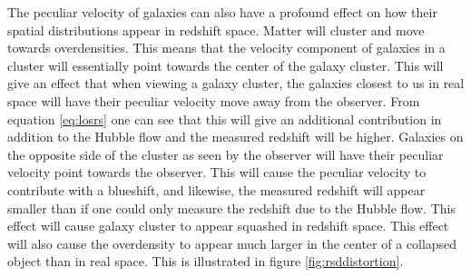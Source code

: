 The peculiar velocity of galaxies can also have a profound effect on how their
spatial distributions appear in redshift space. Matter will cluster and move
towards overdensities. This means that the velocity component of galaxies in a
cluster will essentially point towards the center of the galaxy cluster. This
will give an effect that when viewing a galaxy cluster, the galaxies closest to
us in real space will have their peculiar velocity move away from the observer.
From equation \ref{eq:losrs} one can see that this will give an additional
contribution in addition to the Hubble flow and the measured redshift will be
higher. Galaxies on the opposite side of the cluster as seen by the observer
will have their peculiar velocity point towards the observer. This will cause
the peculiar velocity to contribute with a blueshift, and likewise, the measured
redshift will appear smaller than if one could only measure the redshift due to
the Hubble flow. This effect will cause galaxy cluster to appear squashed in
redshift space. This effect will also cause the overdensity to appear much larger
in the center of a collapsed object than in real space. This is illustrated in
figure \ref{fig:rsddistortion}.\\

